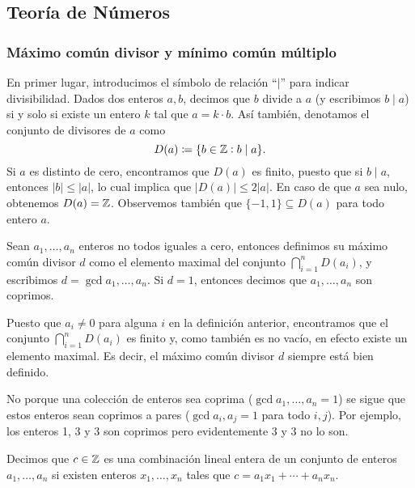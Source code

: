 \subsection{Teoría de Números}
\subsubsection{Máximo común divisor y mínimo común múltiplo}
\noindent
En primer lugar, introducimos el símbolo de relación ``$\mid$'' para indicar divisibilidad. Dados
dos enteros $a, b$, decimos que $b$ divide a $a$ (y escribimos $b \mid a$) si y solo si existe un
entero $k$ tal que $a = k \cdot b$. Así también, denotamos el conjunto de divisores de $a$ como
\begin{equation*}
	D(a) \coloneq \lbrace b \in \mathbb{Z} \vcentcolon b \mid a \rbrace.
\end{equation*}
Si $a$ es distinto de cero, encontramos que $D(a)$ es finito, puesto que si $b \mid a$, entonces
$|b| \leq |a|$, lo cual implica que $|D(a)| \leq 2|a|$. En caso de que $a$ sea nulo, obtenemos $D(a)
= \mathbb{Z}$. Observemos también que $\lbrace -1, 1 \rbrace \subseteq D(a)$ para todo entero $a$.

\begin{definition}
	\label{prerreq:def:gcd}
	Sean $a_1, \ldots, a_n$ enteros no todos iguales a cero, entonces definimos su máximo común
	divisor $d$ como el elemento maximal del conjunto $\bigcap_{i=1}^{n}D(a_i)$, y escribimos $d =
	\gcd{a_1, \ldots, a_n}$. Si $d = 1$, entonces decimos que $a_1, \ldots, a_n$ son coprimos.
\end{definition}

Puesto que $a_i \neq 0$ para alguna $i$ en la definición anterior, encontramos que el conjunto
$\bigcap_{i=1}^{n}D(a_i)$ es finito y, como también es no vacío, en efecto existe un elemento maximal.
Es decir, el máximo común divisor $d$ siempre está bien definido.

\begin{observation}
	No porque una colección de enteros sea coprima ($\gcd{a_1, \ldots, a_n} = 1$) se sigue que
	estos enteros sean coprimos a pares ($\gcd{a_i, a_j} = 1$ para todo $i, j$). Por ejemplo,
	los enteros 1, 3 y 3 son coprimos pero evidentemente 3 y 3 no lo son.
\end{observation}

\begin{definition}
	Decimos que $c \in \mathbb{Z}$ es una combinación lineal entera de un conjunto de enteros $a_1, \ldots,
	a_n$ si existen enteros $x_1, \ldots, x_n$ tales que $c = a_1x_1 + \cdots + a_nx_n$.
\end{definition}

